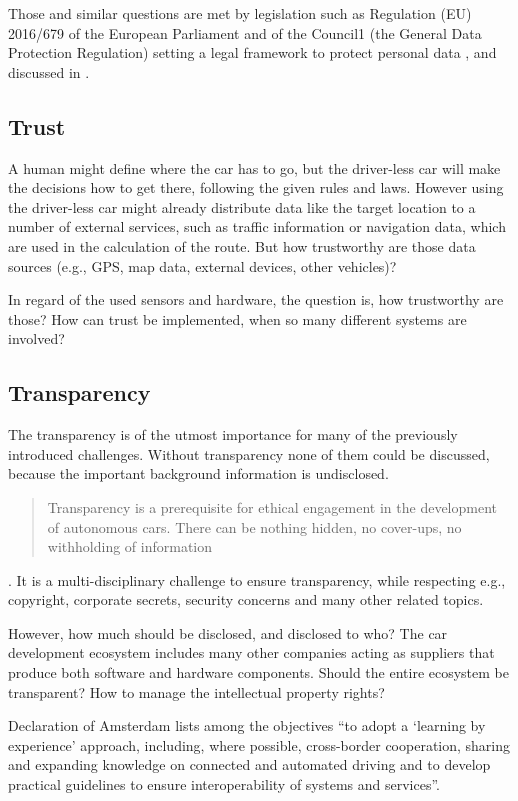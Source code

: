 Those and similar questions are met by legislation such as Regulation (EU) 2016/679 of the European Parliament and of the Council1 (the General Data Protection Regulation) setting a legal framework to protect personal data \cite{EuropeanUnion2016}, and discussed in \cite{doi:10.1093/idpl/ipx005}.


\subsection{Trust}
\label{sec:EAofTC:Trust}

A human might define where the car has to go, but the driver-less car will make the decisions how to get there, following the given rules and laws. However using the driver-less car might already distribute data like the target location to a number of external services, such as traffic information or navigation data, which are used in the calculation of the route. But how trustworthy are those data sources (e.g., GPS, map data, external devices, other vehicles)? 

In regard of the used sensors and hardware, the question is, how trustworthy are those? How can trust be implemented, when so many different systems are involved? 


\subsection{Transparency}
\label{sec:EAofTC:Transparency}

The transparency is of the utmost importance for many of the previously introduced challenges. Without transparency none of them could be discussed, because the important background information is undisclosed. \blockquote{Transparency is a prerequisite for ethical engagement in the development of autonomous cars. There can be nothing hidden, no cover-ups, no withholding of information} \cite{McBride:2016:EDC:2874239.2874265}. It is a multi-disciplinary challenge to ensure transparency, while respecting e.g., copyright, corporate secrets, security concerns and many other related topics. 

However, how much should be disclosed, and disclosed to who? The car development ecosystem includes many other companies acting as suppliers that produce both software and hardware components. Should the entire ecosystem be transparent? How to manage the intellectual property rights?

Declaration of Amsterdam \cite{GovernmentNL2017} lists among the objectives \enquote{to adopt a \enquote{learning by experience} approach, including, where possible, cross-border cooperation, sharing and expanding knowledge on connected and automated driving and to develop practical guidelines to ensure interoperability of systems and services}.

